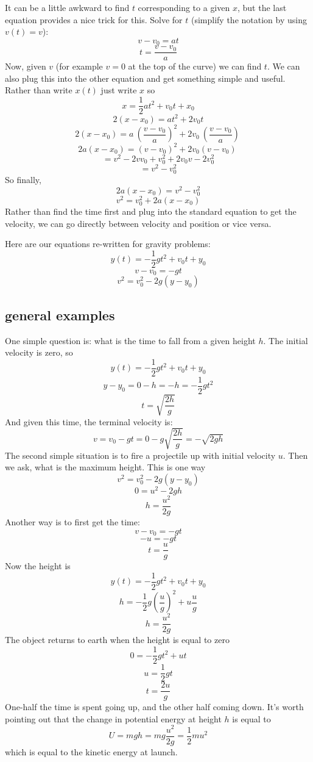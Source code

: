 \documentclass[11pt, oneside]{article}   	%
\begin{document}
It can be a little awkward to find $t$ corresponding to a given $x$, but the last equation provides a nice trick for this.  Solve for $t$ (simplify the notation by using $v(t) = v$):
\[ v-v_0 = at \]
\[ t = \frac{v - v_0}{a} \]
Now, given $v$ (for example $v=0$ at the top of the curve) we can find $t$.  We can also plug this into the other equation and get something simple and useful.  Rather than write $x(t)$ just write $x$ so
\[ x = \frac{1}{2}at^2 + v_0t + x_0 \]
\[ 2(x-x_0) = at^2 + 2v_0t \]
\[ 2(x-x_0) = a \ (\frac{v - v_0}{a})^2 + 2v_0 \ (\frac{v - v_0}{a}) \ \]
\[ 2a(x - x_0) = (v - v_0)^2 + 2 v_0 (v - v_0) \ \]
\[ = v^2 - 2v v_0 + v_0^2 + 2v_0 v - 2v_0^2  \]
\[ = v^2  - v_0^2  \]
So finally,
\[ 2a(x - x_0) = v^2  - v_0^2  \]
\[ v^2 = v_0^2 + 2a(x - x_0) \]
Rather than find the time first and plug into the standard equation to get the velocity, we can go directly between velocity and position or vice versa.

Here are our equations re-written for gravity problems:
\[ y(t) = -\frac{1}{2}gt^2 + v_0t + y_0 \]
\[ v - v_0 = -gt \]
\[ v^2 = v_0^2 - 2g(y - y_0) \]
\subsection*{general examples}
One simple question is:  what is the time to fall from a given height $h$.  The initial velocity is zero, so
\[ y(t) = -\frac{1}{2}gt^2 + v_0t + y_0 \]
\[ y - y_0 = 0 - h = -h = -\frac{1}{2}gt^2 \]
\[ t = \sqrt{\frac{2h}{g}} \]
And given this time, the terminal velocity is:
\[ v = v_0 - gt = 0 - g \sqrt{\frac{2h}{g}} = -\sqrt{2gh} \]
The second simple situation is to fire a projectile up with initial velocity $u$.  Then we ask, what is the maximum height.  This is one way
\[ v^2 = v_0^2 - 2g(y - y_0) \]
\[ 0 = u^2 - 2gh \]
\[ h = \frac{u^2}{2g} \]
Another way is to first get the time:
\[ v - v_0 = -gt \]
\[ - u = -gt \]
\[ t = \frac{u}{g} \]
Now the height is
\[ y(t) = -\frac{1}{2}gt^2 + v_0t + y_0 \]
\[ h = -\frac{1}{2}g(\frac{u}{g})^2 + u\frac{u}{g} \]
\[ h = \frac{u^2}{2g}  \]
The object returns to earth when the height is equal to zero
\[ 0 = -\frac{1}{2}gt^2 + ut \]
\[ u = \frac{1}{2}gt \]
\[ t = \frac{2u}{g} \]
One-half the time is spent going up, and the other half coming down.  It's worth pointing out that the change in potential energy at height $h$ is equal to 
\[ U = mgh = mg \frac{u^2}{2g} = \frac{1}{2} m u^2 \]
which is equal to the kinetic energy at launch.
\end{document}
